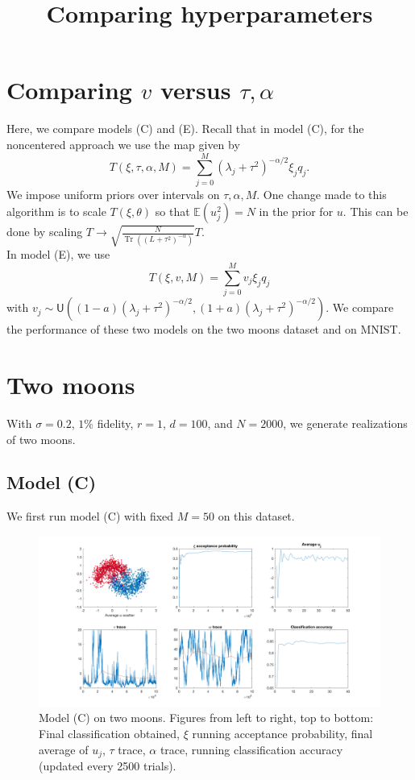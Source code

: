 \documentclass{siamart1116}
\title{Comparing hyperparameters}
\author{\TheAuthors}
\date{}
\DeclareMathOperator{\Tr}{Tr}
\begin{document}
\maketitle
\setlength{\unitlength}{1in}
\setlength{\parindent}{0in}
\section{Comparing $v$ versus $\tau, \alpha$}
    Here, we compare models (C) and (E). Recall that in model (C), for the noncentered approach we use the map given by 
    \[T(\xi, \tau, \alpha, M) = \sum_{j=0}^{M} (\lambda_j + \tau^2)^{-\alpha/2} \xi_j q_j.\]
    We impose uniform priors over intervals on $\tau, \alpha, M$. One change made to this algorithm is to scale $T(\xi, \theta)$ so that $\mathbb{E}(u_j^2) = N$ in the prior for $u$. This can be done by scaling $T \to \sqrt{\frac{N}{\Tr ((L + \tau^2)^{-\alpha}) }}T$.\\

    In model (E), we use 
    \[T(\xi, v, M) = \sum_{j=0}^{M} v_j \xi_j q_j\]
    with $v_j \sim \mathsf{U}\left( (1-a)(\lambda_j + \tau^2)^{-\alpha/2}, (1+a)(\lambda_j + \tau^2)^{-\alpha/2} \right).$
    We compare the performance of these two models on the two moons dataset and on MNIST.\\
    
\section{Two moons}
    With $\sigma=0.2$, $1\%$ fidelity, $r=1$, $d=100$, and $N=2000$, we generate realizations of two moons.
    \subsection{Model (C)}
        We first run model (C) with fixed $M=50$ on this dataset.

        \begin{figure}[!htb]
            \caption{\label{fig:model_c_two_moons}Model (C) on two moons. Figures from left to right, top to bottom: Final classification obtained, $\xi$ running acceptance probability, final average of $u_j$, $\tau$ trace, $\alpha$ trace, running classification accuracy (updated every 2500 trials).}
            \includegraphics[width=\linewidth]{moons/learn_t_a/all.png}
        \end{figure}
\end{document}
